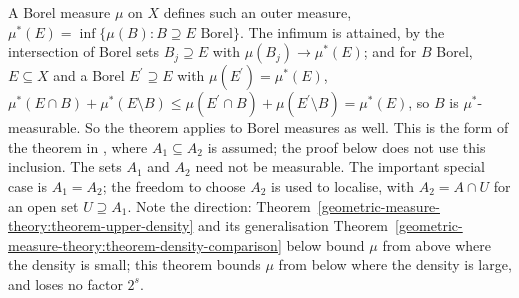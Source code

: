 A Borel measure $\mu$ on $X$ defines such an outer measure, $\mu^*(E) = \inf\{\mu(B) : B \supseteq E \text{ Borel}\}$. The infimum is attained, by the intersection of Borel sets $B_j \supseteq E$ with
$\mu(B_j) \to \mu^*(E)$; and for $B$ Borel, $E \subseteq X$ and a Borel $E^{\prime} \supseteq E$ with $\mu(E^{\prime}) = \mu^*(E)$,
$\mu^*(E \cap B) + \mu^*(E \setminus B) \leq \mu(E^{\prime} \cap B) + \mu(E^{\prime} \setminus B) = \mu^*(E)$, so $B$ is $\mu^*$-measurable. So the theorem applies to Borel measures as well.
This is the form of the theorem in \cite{simon-gmt}, where $A_1 \subseteq A_2$ is assumed; the proof below does not use this inclusion. The sets $A_1$ and $A_2$ need not be measurable. The
important special case is $A_1 = A_2$; the freedom to choose $A_2$ is used to localise, with $A_2 = A \cap U$ for an open set $U \supseteq A_1$. Note the direction: Theorem~\ref{geometric-measure-theory:theorem-upper-density} and its generalisation Theorem~\ref{geometric-measure-theory:theorem-density-comparison} below bound $\mu$ from above where the density is small;
this theorem bounds $\mu$ from below where the density is large, and loses no factor $2^s$.

